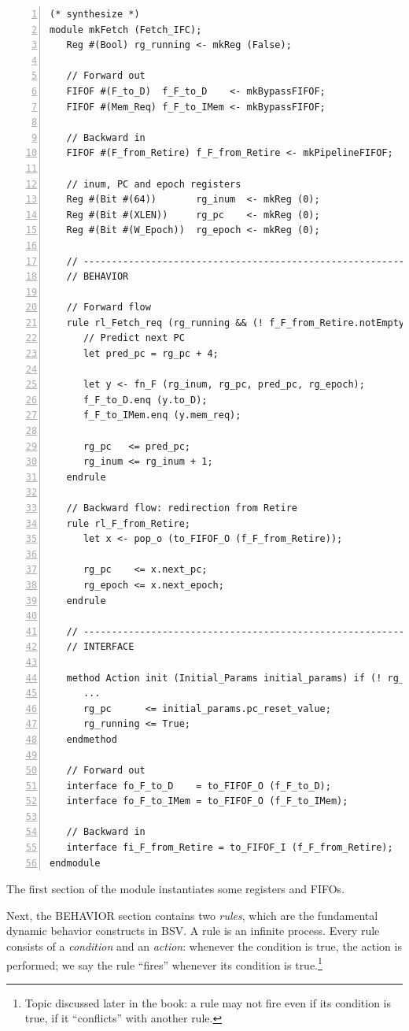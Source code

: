 {\small
\begin{Verbatim}[frame=single, numbers=left, label=(In file:src\_Fife/S1\_Fetch.bsv)]
(* synthesize *)
module mkFetch (Fetch_IFC);
   Reg #(Bool) rg_running <- mkReg (False);

   // Forward out
   FIFOF #(F_to_D)  f_F_to_D    <- mkBypassFIFOF;
   FIFOF #(Mem_Req) f_F_to_IMem <- mkBypassFIFOF;

   // Backward in
   FIFOF #(F_from_Retire) f_F_from_Retire <- mkPipelineFIFOF;

   // inum, PC and epoch registers
   Reg #(Bit #(64))       rg_inum  <- mkReg (0);
   Reg #(Bit #(XLEN))     rg_pc    <- mkReg (0);
   Reg #(Bit #(W_Epoch))  rg_epoch <- mkReg (0);

   // ----------------------------------------------------------------
   // BEHAVIOR

   // Forward flow
   rule rl_Fetch_req (rg_running && (! f_F_from_Retire.notEmpty));
      // Predict next PC
      let pred_pc = rg_pc + 4;

      let y <- fn_F (rg_inum, rg_pc, pred_pc, rg_epoch);
      f_F_to_D.enq (y.to_D);
      f_F_to_IMem.enq (y.mem_req);

      rg_pc   <= pred_pc;
      rg_inum <= rg_inum + 1;
   endrule

   // Backward flow: redirection from Retire
   rule rl_F_from_Retire;
      let x <- pop_o (to_FIFOF_O (f_F_from_Retire));

      rg_pc    <= x.next_pc;
      rg_epoch <= x.next_epoch;
   endrule

   // ----------------------------------------------------------------
   // INTERFACE

   method Action init (Initial_Params initial_params) if (! rg_running);
      ...
      rg_pc      <= initial_params.pc_reset_value;
      rg_running <= True;
   endmethod

   // Forward out
   interface fo_F_to_D    = to_FIFOF_O (f_F_to_D);
   interface fo_F_to_IMem = to_FIFOF_O (f_F_to_IMem);

   // Backward in
   interface fi_F_from_Retire = to_FIFOF_I (f_F_from_Retire);
endmodule
\end{Verbatim}
}

The first section of the module instantiates some registers and FIFOs.

Next, the BEHAVIOR section contains two \emph{rules}, which are the
fundamental dynamic behavior constructs in BSV.  A rule is an infinite
process.  Every rule consists of a \emph{condition} and an
\emph{action}: whenever the condition is true, the action is
performed; we say the rule ``fires'' whenever its condition is
true.\footnote{Topic discussed later in the book: a rule may not fire
even if its condition is true, if it ``conflicts'' with another rule.}

